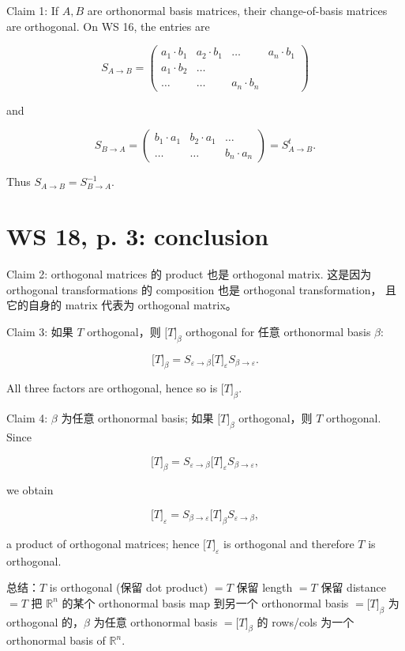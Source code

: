 Claim 1: If \(A,B\) are orthonormal basis matrices, their change-of-basis matrices are orthogonal. On WS 16, the entries are

\[S_{A\rightarrow B} = \begin{pmatrix}
{a_{1} \cdot b_{1}} & {a_{2} \cdot b_{1}} & \ldots & {a_{n} \cdot b_{1}} \\
{a_{1} \cdot b_{2}} & \ldots & & \\
\ldots & \ldots & {a_{n} \cdot b_{n}} &
\end{pmatrix}\]

and

\[S_{B\rightarrow A} = \begin{pmatrix}
{b_{1} \cdot a_{1}} & {b_{2} \cdot a_{1}} & \ldots \\
\ldots & \ldots & {b_{n} \cdot a_{n}}
\end{pmatrix} = S_{A\rightarrow B}^{t}.\]

Thus \(S_{A\rightarrow B} = S_{B\rightarrow A}^{- 1}\).

\section{WS 18, p. 3: conclusion}

Claim 2: orthogonal matrices 的 product 也是 orthogonal matrix. 这是因为 orthogonal transformations 的 composition 也是 orthogonal transformation， 且它的自身的 matrix 代表为 orthogonal matrix。

Claim 3: 如果 \(T\) orthogonal，则 \(\lbrack T\rbrack_{\beta}\) orthogonal for 任意 orthonormal basis \(\beta\):

\[\lbrack T\rbrack_{\beta} = S_{\varepsilon\rightarrow\beta}\lbrack T\rbrack_{\varepsilon}S_{\beta\rightarrow\varepsilon}.\]

All three factors are orthogonal, hence so is \(\lbrack T\rbrack_{\beta}\).

Claim 4: \(\beta\) 为任意 orthonormal basis; 如果 \(\lbrack T\rbrack_{\beta}\) orthogonal，则 \(T\) orthogonal. Since

\[\lbrack T\rbrack_{\beta} = S_{\varepsilon\rightarrow\beta}\lbrack T\rbrack_{\varepsilon}S_{\beta\rightarrow\varepsilon},\]

we obtain

\[\lbrack T\rbrack_{\varepsilon} = S_{\beta\rightarrow\varepsilon}\lbrack T\rbrack_{\beta}S_{\varepsilon\rightarrow\beta},\]

a product of orthogonal matrices; hence \(\lbrack T\rbrack_{\varepsilon}\) is orthogonal and therefore \(T\) is orthogonal.

总结：\(T\) is orthogonal (保留 dot product) \(= T\) 保留 length \(= T\) 保留 distance \(= T\) 把 \(\mathbb{R}^{n}\) 的某个 orthonormal basis map 到另一个 orthonormal basis \(= \lbrack T\rbrack_{\beta}\) 为 orthogonal 的，\(\beta\) 为任意 orthonormal basis \(= \lbrack T\rbrack_{\beta}\) 的 rows/cols 为一个 orthonormal basis of \(\mathbb{R}^{n}\).

